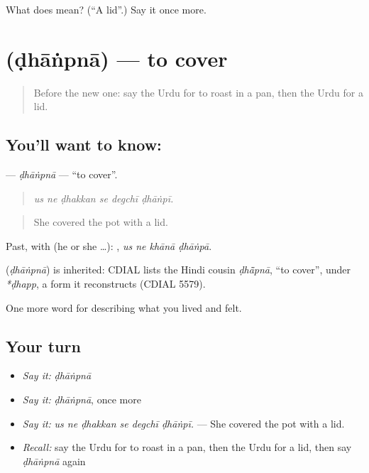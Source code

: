 \begin{tcolorbox}[breakable,colback=teal!4,colframe=teal!35!black,title={Before you move on}]
What does  mean? (\textquotedblleft{}A lid\textquotedblright{}.) Say it once more.
\end{tcolorbox}
\section[\texorpdfstring{\ur{ڈھانپنا} (ḍhāṅpnā)}{ڈھانپنا (ḍhāṅpnā)}]{ (ḍhāṅpnā) — to cover}

\label{lesson:UR-C508-dhanpna}



\begin{quote}
Before the new one: say the Urdu for to roast in a pan, then the Urdu for a lid.
\end{quote}

\subsection*{You'll want to know: }
\textbf{} — \emph{ḍhāṅpnā} — \textquotedblleft{}to cover\textquotedblright{}.

\begin{quote}
     
\end{quote}

\begin{quote}
\emph{us ne ḍhakkan se degchī ḍhāṅpī.}
\end{quote}

\begin{quote}
She covered the pot with a lid.
\end{quote}

Past, with  (he or she …):    , \emph{us ne khānā ḍhāṅpā}.

\begin{cousinweb}
\textbf{} (\emph{ḍhāṅpnā}) is inherited: CDIAL lists the Hindi cousin \emph{ḍhā̃pnā}, \textquotedblleft{}to cover\textquotedblright{}, under \emph{*ḍhapp}, a form it reconstructs (CDIAL 5579).
\end{cousinweb}

\begin{grammarlens}[title={What you've built}]
One more word for describing what you lived and felt.
\end{grammarlens}

\subsection*{Your turn}
\begin{itemize}
\raggedright
  \item \emph{Say it:} \emph{ḍhāṅpnā}
  \item \emph{Say it:} \emph{ḍhāṅpnā}, once more
  \item \emph{Say it:} \emph{us ne ḍhakkan se degchī ḍhāṅpī.} — She covered the pot with a lid.
  \item \emph{Recall:} say the Urdu for to roast in a pan, then the Urdu for a lid, then say \emph{ḍhāṅpnā} again
\end{itemize}

